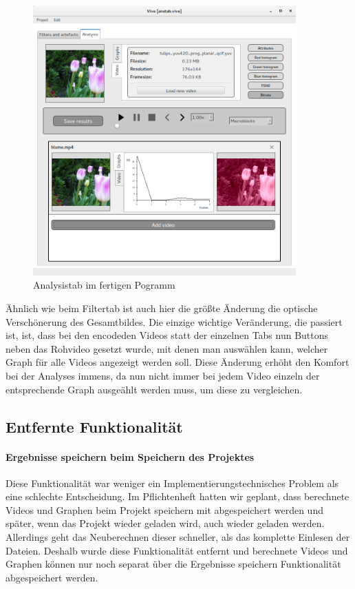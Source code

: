 \documentclass{scrartcl}
\begin{document}
{\begin{figure}[ht]
\includegraphics[width=0.9\textwidth]{Pictures/analysistabneu.png}
\caption{Analysistab im fertigen Pogramm}
\end{figure}
Ähnlich wie beim Filtertab ist auch hier die größte Änderung die optische Verschönerung des Gesamtbildes. Die einzige wichtige Veränderung, die passiert ist, ist, dass bei den encodeden Videos statt der einzelnen Tabs nun Buttons neben das Rohvideo gesetzt wurde, mit denen man auswählen kann, welcher Graph für alle Videos angezeigt werden soll. Diese Änderung erhöht den Komfort bei der Analyses immens, da nun nicht immer bei jedem Video einzeln der entsprechende Graph ausgeählt werden muss, um diese zu vergleichen.
\newpage
\hfill
\newpage
\subsection{Entfernte Funktionalität}
\bigskip
\paragraph{Ergebnisse speichern beim Speichern des Projektes} Diese Funktionalität war weniger ein Implementierungstechnisches Problem als eine schlechte Entscheidung. Im Pflichtenheft hatten wir geplant, dass berechnete Videos und Graphen beim Projekt speichern mit abgespeichert werden und später, wenn das Projekt wieder geladen wird, auch wieder geladen werden. Allerdings geht das Neuberechnen dieser schneller, als das komplette Einlesen der Dateien. Deshalb wurde diese Funktionalität entfernt und berechnete Videos und Graphen können nur noch separat über die Ergebnisse speichern Funktionalität abgespeichert werden.
}
\end{document}
